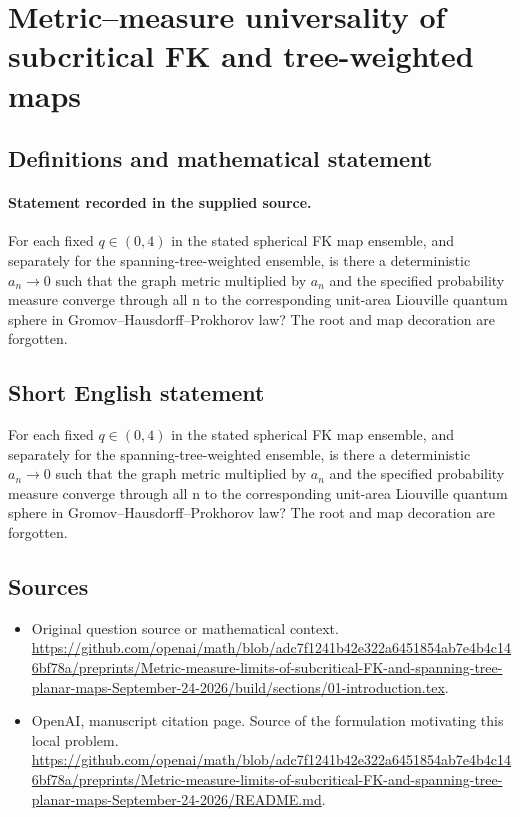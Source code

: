 \documentclass[11pt]{article}
\begin{document}
\section*{Metric–measure universality of subcritical FK and tree-weighted maps}\label{statement}
\subsection{Definitions and mathematical statement}
\paragraph{Statement recorded in the supplied source.}
For each fixed $q\in (0,4)$ in the stated spherical FK map ensemble, and separately for the spanning-tree-weighted ensemble, is there a deterministic $a_n\to 0$ such that the graph metric multiplied by $a_n$ and the specified probability measure converge through all n to the corresponding unit-area Liouville quantum sphere in Gromov–Hausdorff–Prokhorov law? The root and map decoration are forgotten.
\subsection{Short English statement}
For each fixed $q\in (0,4)$ in the stated spherical FK map ensemble, and separately for the spanning-tree-weighted ensemble, is there a deterministic $a_n\to 0$ such that the graph metric multiplied by $a_n$ and the specified probability measure converge through all n to the corresponding unit-area Liouville quantum sphere in Gromov–Hausdorff–Prokhorov law? The root and map decoration are forgotten.
\subsection{Sources}
\begin{itemize}
\item[S1] Original question source or mathematical context.
\url{https://github.com/openai/math/blob/adc7f1241b42e322a6451854ab7e4b4c146bf78a/preprints/Metric-measure-limits-of-subcritical-FK-and-spanning-tree-planar-maps-September-24-2026/build/sections/01-introduction.tex}.
\item[S2] OpenAI, manuscript citation page. Source of the formulation motivating this local problem.
\url{https://github.com/openai/math/blob/adc7f1241b42e322a6451854ab7e4b4c146bf78a/preprints/Metric-measure-limits-of-subcritical-FK-and-spanning-tree-planar-maps-September-24-2026/README.md}.
\end{itemize}
\end{document}

